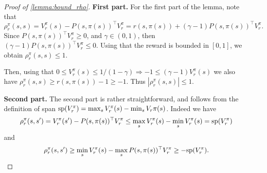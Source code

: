 \begin{proof}[Proof of \cref{lemma:bound_rho}]
    {\bf First part.} For the first part of the lemma, note that
\[
\rho_r^\pi(s,s) = V_r^\pi(s) -  P(s,\pi(s))^\top V_r^\pi = r(s,\pi(s)) + (\gamma-1)P(s,\pi(s))^\top V_r^\pi.
\]
Since $P(s,\pi(s))^\top V_r^\pi\geq 0$, and  $\gamma \in (0,1)$, then $(\gamma-1)P(s,\pi(s))^\top V_r^\pi\leq 0$. Using that the reward is bounded in $[0,1]$, we obtain $\rho_r^\pi(s,s)\leq 1$.

Then, using that $0\leq V_r^\pi(s)\leq 1/(1-\gamma) \Rightarrow  -1 \leq (\gamma-1)V_r^\pi(s) $  we also have 
 $\rho_r^\pi(s,s) \geq r(s,\pi(s)) -1 \geq -1$. Thus $|\rho_r^\pi(s,s)|\leq 1$.

{\bf Second part.} The second part is rather straightforward, and follows from the definition of span ${\rm sp}(V_r^\pi)=\max_s V_r^\pi(s) - \min_s V_r\pi(s)$. Indeed we have
\[
\rho_r^\pi(s,s')=V_r^\pi(s')-P(s,\pi(s))^\top V_r^\pi \leq \max_s V_r^\pi(s) -\min_s V_r^\pi(s)={\rm sp}(V_r^\pi)
\]
and
\[
\rho_r^\pi(s,s')\geq \min_{s}V_r^\pi(s)-\max_{s} P(s,\pi(s))^\top V_r^\pi\geq -{\rm sp}(V_r^\pi).
\]


\end{proof}
